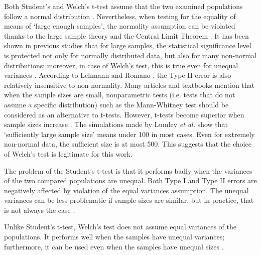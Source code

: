 Both Student's and Welch's t-test assume that the two examined populations follow a normal distribution \cite{welch}. Nevertheless, when testing for the equality of means of `large enough samples', the normality assumption can be violated thanks to the large sample theory and the Central Limit Theorem \cite{lehmann}. It has been shown in previous studies that for large samples, the statistical significance level is protected not only for normally distributed data, but also for many non-normal distributions; moreover, in case of Welch's test, this is true even for unequal variances \cite{zimmerman_zumbo_1993, zumbo_coulombe_1997, lumley}. According to  Lehmann and Romano \cite{lehmann}, the Type II error is also relatively insensitive to non-normality. Many articles and textbooks mention that when the sample sizes are small, nonparametric tests (i.e. tests that do not assume a specific distribution) such as the Mann-Whitney test \cite{mann} should be considered as an alternative to t-tests.
However, t-tests become superior when sample sizes increase \cite{zimmerman1998, lumley}. The simulations made by Lumley \textit{et al.} \cite{lumley} show that `sufficiently large sample size' means under 100 in most cases. Even for extremely non-normal data, the sufficient size is at most 500. This suggests that the choice of Welch's test is legitimate for this work.

The problem of the Student's t-test is that it performs badly when the variances of the two compared populations are unequal. Both Type I and Type II errors are negatively affected by violation of the equal variances assumption. The unequal variances can be less problematic if sample sizes are similar, but in practice, that is not always the case \cite{ruxton}.

Unlike Student's t-test, Welch's test does not assume equal variances of the populations. It performs well when the samples have unequal variances; furthermore, it can be used even when the samples have unequal sizes \cite{derrick}.

